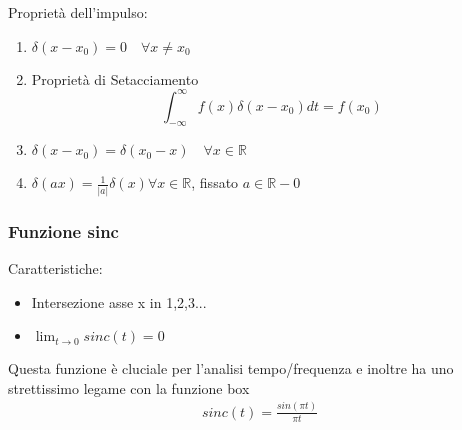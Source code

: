     \noindent
    Proprietà dell’impulso:
    \begin{enumerate}
        \item $\delta(x-x_0)=0\quad\forall x\neq x_0$
        \item Proprietà di Setacciamento\\
        \begin{equation}
            \int_{-\infty}^{\infty} f(x)\delta(x-x_0)dt = f(x_0)
        \end{equation}
        \item $\delta(x-x_0) = \delta(x_0-x)\quad\forall x\in\mathbb{R}$
        \item $\delta(ax)=\frac{1}{|a|}\delta(x)\forall x\in\mathbb{R}$, fissato $a\in\mathbb{R}-{0}$
    \end{enumerate}
    
    \noindent
    \subsubsection{Funzione sinc}
    
    \begin{minipage}{.5\textwidth}
        Caratteristiche:
        \begin{itemize}
            \item Intersezione asse x in 1,2,3...
            \item $\lim_{t\to 0} sinc(t)=0$
        \end{itemize}
        Questa funzione è cluciale per l'analisi tempo/frequenza e inoltre ha uno strettissimo legame con la funzione box
        \begin{align*}
            sinc(t) = \frac{sin(\pi t)}{\pi t}
        \end{align*}
    \end{minipage}
    \begin{minipage}{.4\textwidth}
        \begin{center}
        \end{center}
    \end{minipage}
    
    \noindent
